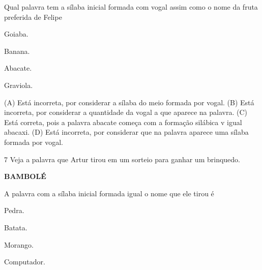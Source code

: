 
Qual palavra tem a sílaba inicial formada com vogal assim como o nome da fruta preferida de Felipe

\begin{minipage}{.5\textwidth}
\begin{escolha}
\item Goiaba.

\item Banana.

\item Abacate.

\item Graviola.
\end{escolha}
\end{minipage}

(A) Está incorreta, por considerar a sílaba do meio formada por vogal.
(B) Está incorreta, por considerar a quantidade da vogal a que aparece
na palavra.
(C) Está correta, pois a palavra abacate começa com a formação silábica
v igual abacaxi.
(D) Está incorreta, por considerar que na palavra aparece uma sílaba
formada por vogal.

\num{7} Veja a palavra que Artur tirou em um sorteio para ganhar um brinquedo.

\textbf{BAMBOLÉ}

A palavra com a sílaba inicial formada igual o nome que ele tirou é

\begin{minipage}{.5\textwidth}
\begin{escolha}
\item Pedra.

\item Batata.

\item Morango.

\item Computador.
\end{escolha}
\end{minipage}

